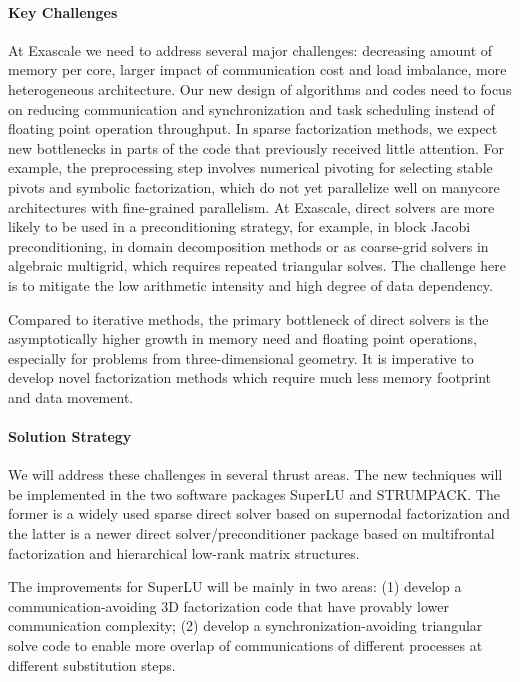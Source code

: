 \paragraph{Key Challenges}
At Exascale we need to address several major challenges:
decreasing amount of memory per core, larger impact of communication
cost and load imbalance, more heterogeneous architecture.
Our new design of algorithms and codes need to focus on
reducing communication and synchronization and task scheduling 
instead of floating point operation throughput. In sparse factorization
methods, we expect new bottlenecks in parts of the code
that previously received little attention. For example, the preprocessing
step involves numerical pivoting for selecting stable pivots and
symbolic factorization, which do not yet parallelize well on manycore
architectures with fine-grained parallelism.
At Exascale, direct solvers are more likely to
be used in a preconditioning strategy, for example, in block Jacobi
preconditioning, in domain decomposition methods or as coarse-grid
solvers in algebraic multigrid, which requires repeated triangular
solves. The challenge here is to mitigate the low arithmetic intensity
and high degree of data dependency.

Compared to iterative methods, the primary bottleneck of direct solvers
is the asymptotically higher growth in memory need and floating point
operations, especially for problems from three-dimensional geometry.
It is imperative to develop novel factorization methods which require
much less memory footprint and data movement.


\paragraph{Solution Strategy}
We will address these challenges in several thrust areas.
The new techniques will be implemented in the two software packages SuperLU
and STRUMPACK. The former is a widely used sparse direct solver based on
supernodal factorization and the latter is a newer direct
solver/preconditioner package based on multifrontal factorization 
and hierarchical low-rank matrix structures.

The improvements for SuperLU will be mainly in two areas: (1) develop
a communication-avoiding 3D factorization code that have provably 
lower communication complexity; (2) develop a synchronization-avoiding
triangular solve code to enable more overlap of communications of different
processes at different substitution steps.


